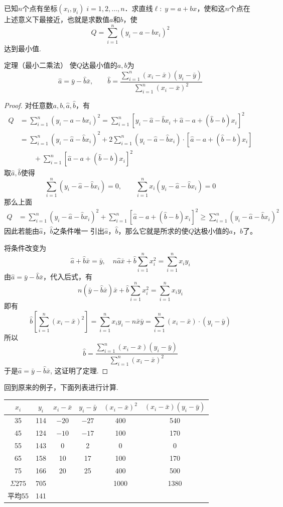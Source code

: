 已知$n$个点有坐标$(x_i,y_i)\; i=1,2,\ldots,n$．求直线$\ell:\; y=a+bx$，使和这$n$个点在上述意义下最接近，也就是求数值$a$和$b$，使
\[Q=\sum^n_{i=1}(y_i-a-bx_i)^2\]
达到最小值.

\begin{blk}{定理（最小二乘法）}
使$Q$达最小值的$a,b$为
\[\hat a=\bar y-\hat b \bar x,\qquad \hat b=\frac{\sum\limits^n_{i=1}(x_i-\bar x)(y_i-\bar y)}{\sum\limits^n_{i=1}(x_i-\bar x)^2}\]
\end{blk}

\begin{proof}
对任意数$a,b,\hat a,\hat b$，有
\[\begin{split}
Q&=\sum^n_{i=1}(y_i-a-bx_i)^2 =\sum^n_{i=1}\left[y_i-\hat a-\hat b x_i+\hat a-a+(\hat b-b)x_i\right]^2\\ 
&=\sum^n_{i=1}\left(y_i-\hat a-\hat b x_i\right)^2+2\sum^n_{i=1}\left(y_i-\hat a-\hat b x_i\right)\cdot \left[\hat a-a+(\hat b-b)x_i\right]\\
&\qquad +\sum^n_{i=1}\left[\hat a-a+(\hat b-b)x_i\right]^2
\end{split}\]
取$\hat a,\hat b$使得
\[\sum^n_{i=1}\left(y_i-\hat a-\hat b x_i\right)=0,\qquad \sum^n_{i=1}x_i\left(y_i-\hat a-\hat b x_i\right)=0\]
那么上面
\[\begin{split}
    Q&=\sum^n_{i=1}\left(y_i-\hat a-\hat b x_i\right)^2+\sum^n_{i=1}\left[\hat a-a+(\hat b-b)x_i\right]^2\ge \sum^n_{i=1}\left(y_i-\hat a-\hat b x_i\right)^2
\end{split}\]
因此若能由$\hat a$，$\hat b$之条件唯一
引出$\hat a$，$\hat b$，那么它就是所求的使$Q$达极小值的$a$，$b$了。

将条件改变为
\[\hat a+\hat b \bar x=\bar y,\quad n\hat a \bar x+\hat b\sum^n_{i=1}x^2_i=\sum^n_{i=1}x_iy_i\]
由$\hat a=\bar y-\hat b\bar x$，代入后式，有
\[n\left(\bar y-\hat b\bar x\right)\bar x+\hat b\sum^n_{i=1}x^2_i=\sum^n_{i=1}x_iy_i\]
即有
\[\hat b\left[\sum^n_{i=1}(x_i-\bar x)^2\right]=\sum^n_{i=1}x_iy_i-n\bar x\bar y=\sum^n_{i=1}(x_i-\bar x)\cdot (y_i-\bar y)\]
所以\[\hat b=\frac{\sum\limits^n_{i=1}(x_i-\bar x)(y_i-\bar y)}{\sum\limits^n_{i=1}(x_i-\bar x)^2}\]
于是$\hat a=\bar y-\hat b\bar x$, 这证明了定理.
\end{proof}

回到原来的例子，下面列表进行计算.
\begin{center}
\begin{tabular}{cccccc}
\hline
$x_i$ & $y_i$&$x_i-\bar x$&$y_i-\bar y$&$(x_i-\bar x)^2$&$(x_i-\bar x)(y_i-\bar y)$\\
\hline
35&114&$-20$&$-27$&400&540\\
45&124&$-10$&$-17$&100&170\\
55&143&0&2&0&0\\
65&158&10&17&100&170\\
75&166&20&25&400&500\\
\hline
$\Sigma 275$&705&&&1000&1380\\
平均55&141\\
\hline
\end{tabular}
\end{center}

